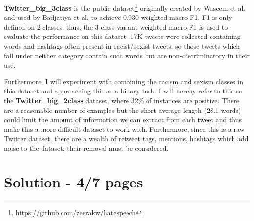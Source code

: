 \documentclass[12pt,a4paper]{article}
\begin{document}
\textbf{Twitter\_big\_3class} is the public dataset\footnote{https://github.com/zeerakw/hatespeech} originally created by Waseem et al. \citeyear{Waseem} and used by Badjatiya et al.\citeyear{Badjatiya} to achieve 0.930 weighted macro F1. F1 is only defined on 2 classes, thus, the 3-class variant weighted macro F1 is used to evaluate the performance on this dataset. 17K tweets were collected containing words and hashtags often present in racist/sexist tweets, so those tweets which fall under neither category contain such words but are non-discriminatory in their use.

Furthermore, I will experiment with combining the racism and sexism classes in this dataset and approaching this as a binary task. I will hereby refer to this as the \textbf{Twitter\_big\_2class} dataset, where 32\% of instances are positive. There are a reasonable number of examples but the short average length (28.1 words) could limit the amount of information we can extract from each tweet and thus make this a more difficult dataset to work with. Furthermore, since this is a raw Twitter dataset, there are a wealth of retweet tags, mentions, hashtags which add noise to the dataset; their removal must be considered.


\section{Solution - 4/7 pages}
\end{document}
